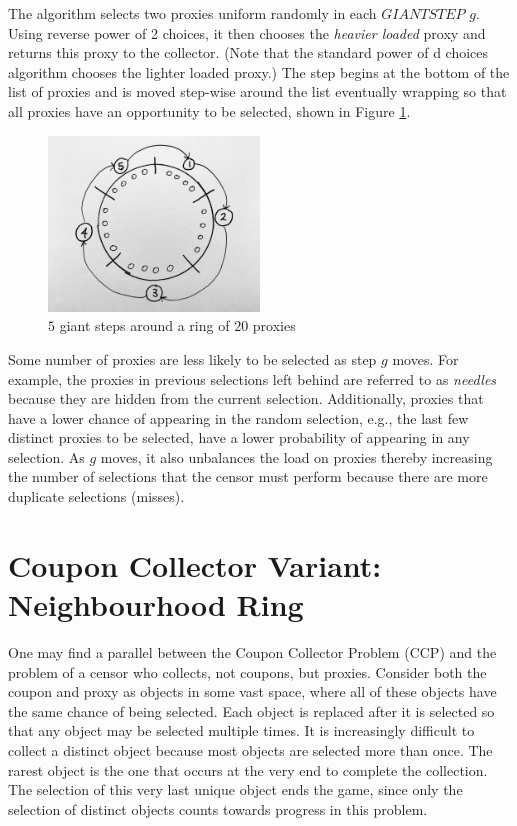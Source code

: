 The algorithm selects two proxies uniform randomly in each $GIANTSTEP$ $g$. Using reverse power of 2 choices, it then chooses the \textit{heavier loaded} proxy and returns this proxy to the collector. (Note that the standard power of d choices algorithm chooses the lighter loaded proxy.) The step begins at the bottom of the list of proxies and is moved step-wise around the list eventually wrapping so that all proxies have an opportunity to be selected, shown in Figure \ref{fig:giantstepring}.

\begin{figure}[h!]
\centering
     \includegraphics[width=0.5\textwidth]{fig/giant_step_ring.png}
    \caption{$5$ giant steps around a ring of $20$ proxies}

    \label{fig:giantstepring}
\end{figure}

Some number of proxies are less likely to be selected as step $g$ moves. For example, the proxies in previous selections left behind are referred to as \emph{needles} because they are hidden from the current selection. Additionally, proxies that have a lower chance of appearing in the random selection, e.g., the last few distinct proxies to be selected, have a lower probability of appearing in any selection. As $g$ moves, it also unbalances the load on proxies thereby increasing the number of selections that the censor must perform because there are more duplicate selections (misses).
\section{Coupon Collector Variant: Neighbourhood Ring}

One may find a parallel between the Coupon Collector Problem (CCP) and the problem of a censor who collects, not coupons, but proxies. Consider both the coupon and proxy as objects in some vast space, where all of these objects have the same chance of being selected. Each object is replaced after it is selected so that any object may be selected multiple times. It is increasingly difficult to collect a distinct object because most objects are selected more than once. The rarest object is the one that occurs at the very end to complete the collection. The selection of this very last unique object ends the game, since only the selection of distinct objects counts towards progress in this problem.

